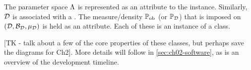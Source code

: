 The parameter space ${\Lambda}$ is represented as an  attribute to the  instance.
Similarly, $\mathcal{D}$ is associated with a . 
The measure/density $\operatorname*{\mathbb{P}_{ob}}$ (or $\mathbb{P}_{\mathcal{D}}$) that is imposed on $(\mathcal{D}, \mathcal{B}_{\mathcal{D}}, \mu_{\mathcal{D}})$ is held as an  attribute.
Each of these is an instance of a  class. 

[TK - talk about a few of the core properties of these classes, but perhaps save the diagrams for Ch2]. 
More details will follow in \ref{sec:ch02-software}, as is an overview of the development timeline. 
